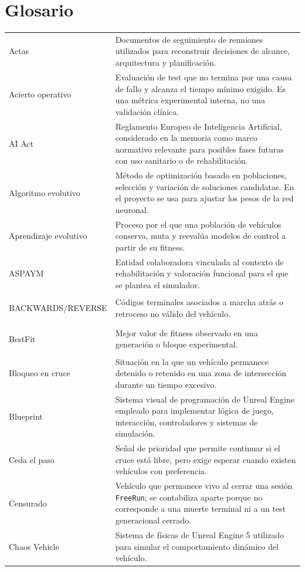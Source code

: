 \chapter*{Glosario}

\begin{longtable}{>{\bfseries\raggedright\arraybackslash}p{4.7cm}L{9.3cm}}
Actas & Documentos de seguimiento de reuniones utilizados para reconstruir decisiones de alcance, arquitectura y planificación.\\
Acierto operativo & Evaluación de test que no termina por una causa de fallo y alcanza el tiempo mínimo exigido. Es una métrica experimental interna, no una validación clínica.\\
AI Act & Reglamento Europeo de Inteligencia Artificial, considerado en la memoria como marco normativo relevante para posibles fases futuras con uso sanitario o de rehabilitación.\\
Algoritmo evolutivo & Método de optimización basado en poblaciones, selección y variación de soluciones candidatas. En el proyecto se usa para ajustar los pesos de la red neuronal.\\
Aprendizaje evolutivo & Proceso por el que una población de vehículos conserva, muta y reevalúa modelos de control a partir de su fitness.\\
ASPAYM & Entidad colaboradora vinculada al contexto de rehabilitación y valoración funcional para el que se plantea el simulador.\\
BACKWARDS/REVERSE & Códigos terminales asociados a marcha atrás o retroceso no válido del vehículo.\\
BestFit & Mejor valor de fitness observado en una generación o bloque experimental.\\
Bloqueo en cruce & Situación en la que un vehículo permanece detenido o retenido en una zona de intersección durante un tiempo excesivo.\\
Blueprint & Sistema visual de programación de Unreal Engine empleado para implementar lógica de juego, interacción, controladores y sistemas de simulación.\\
Ceda el paso & Señal de prioridad que permite continuar si el cruce está libre, pero exige esperar cuando existen vehículos con preferencia.\\
Censurado & Vehículo que permanece vivo al cerrar una sesión \texttt{FreeRun}; se contabiliza aparte porque no corresponde a una muerte terminal ni a un test generacional cerrado.\\
Chaos Vehicle & Sistema de físicas de Unreal Engine 5 utilizado para simular el comportamiento dinámico del vehículo.\\

\end{longtable}
